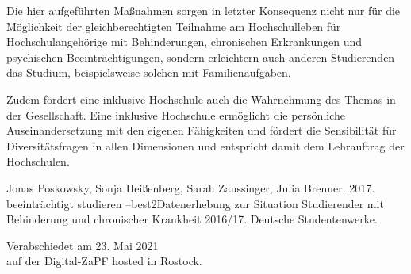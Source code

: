 \documentclass[DIV=calc]{scrartcl}
\begin{document}
Die hier aufgeführten Maßnahmen sorgen in letzter Konsequenz nicht nur für die Möglichkeit der gleichberechtigten Teilnahme am Hochschulleben für Hochschulangehörige mit Behinderungen, chronischen Erkrankungen und psychischen Beeinträchtigungen, sondern erleichtern auch anderen Studierenden das Studium, beispielsweise solchen mit Familienaufgaben.

Zudem fördert eine inklusive Hochschule auch die Wahrnehmung des Themas in der Gesellschaft. Eine inklusive Hochschule ermöglicht die persönliche Auseinandersetzung mit den eigenen Fähigkeiten und fördert die Sensibilität für Diversitätsfragen in allen Dimensionen und entspricht damit dem Lehrauftrag der Hochschulen. 

Jonas Poskowsky, Sonja Heißenberg, Sarah Zaussinger, Julia Brenner. 2017. beeinträchtigt studieren –best2Datenerhebung zur Situation Studierender mit Behinderung und chronischer Krankheit 2016/17. Deutsche Studentenwerke. %
\vspace{1cm} 

\vfill
\begin{flushright}
	Verabschiedet am 23. Mai 2021 \\
	auf der Digital-ZaPF hosted in Rostock.
\end{flushright}
\end{document}
